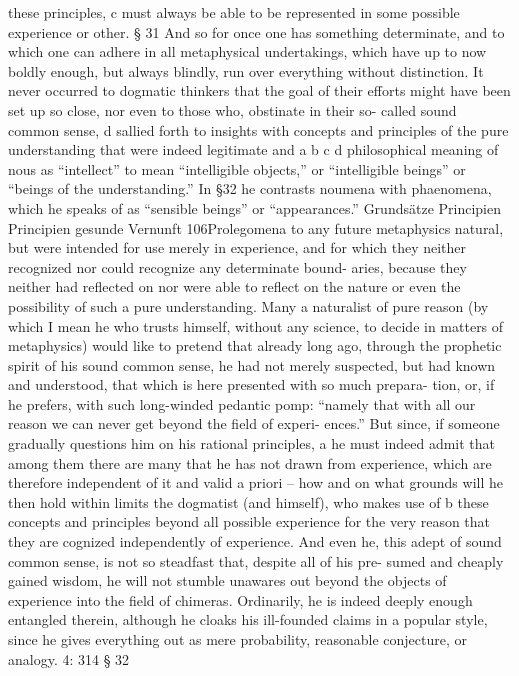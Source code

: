 these principles, c must always be able to be represented in some possible
experience or other.
§ 31
And so for once one has something determinate, and to which one can
adhere in all metaphysical undertakings, which have up to now boldly
enough, but always blindly, run over everything without distinction. It
never occurred to dogmatic thinkers that the goal of their efforts might
have been set up so close, nor even to those who, obstinate in their so-
called sound common sense, d sallied forth to insights with concepts and
principles of the pure understanding that were indeed legitimate and
a
b
c
d
philosophical meaning of nous as “intellect” to mean “intelligible objects,” or “intelligible
beings” or “beings of the understanding.” In §32 he contrasts noumena with phaenomena,
which he speaks of as “sensible beings” or “appearances.”
Grundsätze
Principien
Principien
gesunde Vernunft
106Prolegomena to any future metaphysics
natural, but were intended for use merely in experience, and for which
they neither recognized nor could recognize any determinate bound-
aries, because they neither had reﬂected on nor were able to reﬂect on
the nature or even the possibility of such a pure understanding.
Many a naturalist of pure reason (by which I mean he who trusts
himself, without any science, to decide in matters of metaphysics) would
like to pretend that already long ago, through the prophetic spirit of
his sound common sense, he had not merely suspected, but had known
and understood, that which is here presented with so much prepara-
tion, or, if he prefers, with such long-winded pedantic pomp: “namely
that with all our reason we can never get beyond the ﬁeld of experi-
ences.” But since, if someone gradually questions him on his rational
principles, a he must indeed admit that among them there are many that
he has not drawn from experience, which are therefore independent of
it and valid a priori – how and on what grounds will he then hold within
limits the dogmatist (and himself), who makes use of b these concepts
and principles beyond all possible experience for the very reason that
they are cognized independently of experience. And even he, this adept
of sound common sense, is not so steadfast that, despite all of his pre-
sumed and cheaply gained wisdom, he will not stumble unawares out
beyond the objects of experience into the ﬁeld of chimeras. Ordinarily,
he is indeed deeply enough entangled therein, although he cloaks his
ill-founded claims in a popular style, since he gives everything out as
mere probability, reasonable conjecture, or analogy.
4: 314
§ 32
